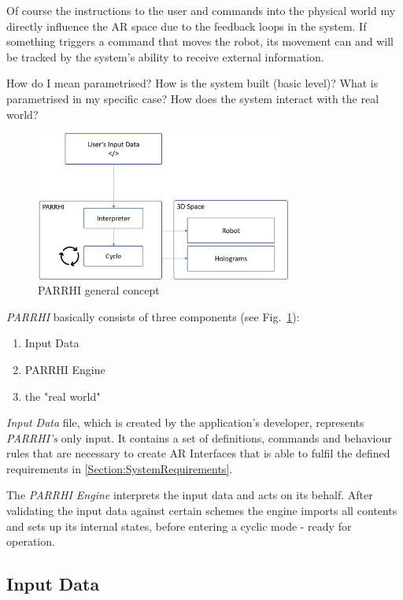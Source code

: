 Of course the instructions to the user and commands into the physical world my directly influence the AR space due to the feedback loops in the system. If something triggers a command that moves the robot, its movement can and will be tracked by the system's ability to receive external information.

How do I mean parametrised?
How is the system built (basic level)?
What is parametrised in my specific case?
How does the system interact with the real world?

\begin{figure}[h]
	\centering
	\includegraphics[width=0.75\textwidth]{Figures/PARRHIConcept01.png}
	\caption{PARRHI general concept}
	\label{Fig:PARRHIConcept}
\end{figure}

\textit{PARRHI} basically consists of three components (see Fig.~\ref{Fig:PARRHIConcept}):
\begin{enumerate}
	\setlength\itemsep{-1em}
	\item Input Data
	\item PARRHI Engine
	\item the "real world"
\end{enumerate}

\textit{Input Data} file, which is created by the application's developer, represents \textit{PARRHI's} only input. It contains a set of definitions, commands and behaviour rules that are necessary to create AR Interfaces that is able to fulfil the defined requirements in \ref{Section:SystemRequirements}.

The \textit{PARRHI Engine} interprets the input data and acts on its behalf. After validating the input data against certain schemes the engine imports all contents and sets up its internal states, before entering a cyclic mode - ready for operation.

\clearpage
\subsection{Input Data}

